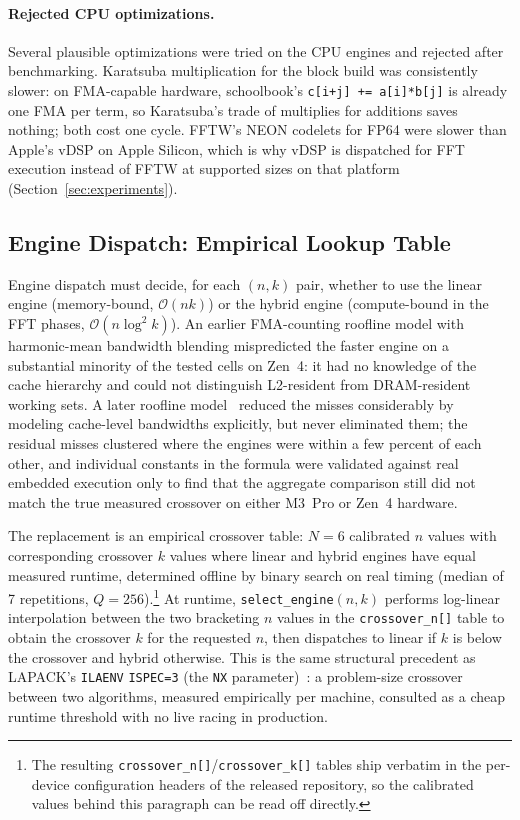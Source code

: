 \documentclass[11pt]{article}
\newcommand{\bigO}{\mathcal{O}}
\begin{document}
\paragraph{Rejected CPU optimizations.} Several plausible optimizations
were tried on the CPU engines and rejected after benchmarking. Karatsuba
multiplication for the block build was consistently slower: on FMA-capable
hardware, schoolbook's \texttt{c[i+j] += a[i]*b[j]} is already one FMA per
term, so Karatsuba's trade of multiplies for additions saves nothing; both
cost one cycle. FFTW's NEON codelets for FP64 were slower than Apple's
vDSP on Apple Silicon, which is why vDSP is dispatched for FFT execution
instead of FFTW at supported sizes on that platform
(Section~\ref{sec:experiments}).

\subsection{Engine Dispatch: Empirical Lookup Table}\label{sec:dispatch}

Engine dispatch must decide, for each $(n,k)$ pair, whether to use the
linear engine (memory-bound, $\bigO(nk)$) or the hybrid engine
(compute-bound in the FFT phases, $\bigO(n \log^2 k)$). An earlier
FMA-counting roofline model with harmonic-mean bandwidth blending
mispredicted the faster engine on a substantial minority of the tested
cells on Zen~4: it had no knowledge of the
cache hierarchy and could not distinguish L2-resident from DRAM-resident
working sets. A later roofline model~\citep{williams2009} reduced the
misses considerably by modeling cache-level bandwidths explicitly, but
never eliminated them; the residual misses clustered where the engines
were within a few percent of each
other, and individual constants in the formula were validated against real
embedded execution only to find that the aggregate comparison still did not
match the true measured crossover on either M3~Pro or Zen~4 hardware.

The replacement is an empirical crossover table: $N = 6$ calibrated $n$
values with corresponding crossover $k$ values where linear and hybrid
engines have equal measured runtime, determined offline by binary search on
real timing (median of 7 repetitions, $Q = 256$).\footnote{The resulting
\texttt{crossover\_n[]}/\texttt{crossover\_k[]} tables ship verbatim in the
per-device configuration headers of the released repository, so the
calibrated values behind this paragraph can be read off directly.} At runtime,
\texttt{select\_engine}\allowbreak$(n,k)$ performs log-linear interpolation between
the two bracketing $n$ values in the \texttt{crossover\_n[]} table to
obtain the crossover $k$ for the requested $n$, then dispatches to linear
if $k$ is below the crossover and hybrid otherwise.  This is the same
structural precedent as LAPACK's \texttt{ILAENV} \texttt{ISPEC=3} (the
\texttt{NX} parameter)~\citep{anderson1999}: a problem-size crossover
between two algorithms, measured empirically per machine, consulted as a
cheap runtime threshold with no live racing in production.
\end{document}
